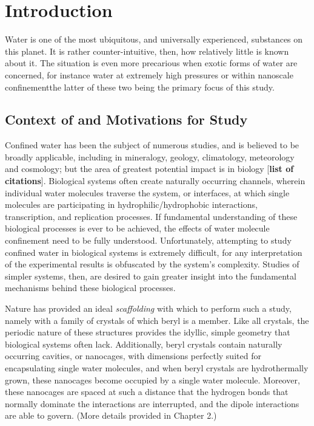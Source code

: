 
\chapter{Introduction}
\label{chap:introduction}


Water is one of the most ubiquitous, and universally experienced, substances on this planet. It is rather counter-intuitive, then, how relatively little is known about it. The situation is even more precarious when exotic forms of water are concerned, for instance water at extremely high pressures or within nanoscale confinement\embdashtext the latter of these two being the primary focus of this study. %



\section{Context of and Motivations for Study}
\label{motivations}

Confined water has been the subject of numerous studies, and is believed to be broadly applicable, including in mineralogy, geology, climatology, meteorology and cosmology; but the area of greatest potential impact is in biology [\textbf{list of citations}]. Biological systems often create naturally occurring channels, wherein individual water molecules traverse the system, or interfaces, at which single molecules are participating in hydrophilic/hydrophobic interactions, transcription, and replication processes. If fundamental understanding of these biological processes is ever to be achieved, the effects of water molecule confinement need to be fully understood. Unfortunately, attempting to study confined water in biological systems is extremely difficult, for any interpretation of the experimental results is obfuscated by the system's complexity. Studies of simpler systems, then, are desired to gain greater insight into the fundamental mechanisms behind these biological processes.  

Nature has provided an ideal \textit{scaffolding} with which to perform such a study, namely with a family of crystals of which beryl is a member. Like all crystals, the periodic nature of these structures provides the idyllic, simple geometry that biological systems often lack. Additionally, beryl crystals contain naturally occurring cavities, or nanocages, with dimensions perfectly suited for encapsulating single water molecules, and when beryl crystals are hydrothermally grown, these nanocages become occupied by a single water molecule. Moreover, these nanocages are spaced at such a distance that the hydrogen bonds that normally dominate the interactions are interrupted, and the dipole interactions are able to govern. (More details provided in Chapter 2.)
 
